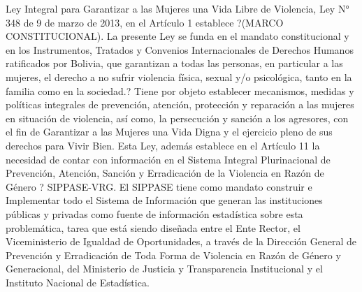 Ley Integral para Garantizar a las Mujeres una Vida Libre de Violencia, Ley N° 348 de 9 de marzo de 2013, en el Artículo 1 establece ?(MARCO CONSTITUCIONAL). La presente Ley se funda en el mandato constitucional y en los Instrumentos, Tratados y Convenios Internacionales de Derechos Humanos ratificados por Bolivia, que garantizan a todas las personas, en particular a las mujeres, el derecho a no sufrir violencia física, sexual y/o psicológica, tanto en la familia como en la sociedad.?
Tiene por objeto establecer mecanismos, medidas y políticas integrales de prevención, atención, protección y reparación a las mujeres en situación de violencia, así como, la persecución y sanción a los agresores, con el fin de Garantizar a las Mujeres una Vida Digna y el ejercicio pleno de sus derechos para Vivir Bien.
Esta Ley, además establece en el Artículo 11 la necesidad de contar con información en el Sistema Integral Plurinacional de Prevención, Atención, Sanción y Erradicación de la Violencia en Razón de Género ? SIPPASE-VRG.
El SIPPASE tiene como mandato construir e Implementar todo el Sistema de Información que generan las instituciones públicas y privadas como fuente de información estadística sobre esta problemática, tarea que está siendo diseñada entre el Ente Rector, el Viceministerio de Igualdad de Oportunidades, a través de la Dirección General de Prevención y Erradicación de Toda Forma de Violencia en Razón de Género y Generacional, del Ministerio de Justicia y Transparencia Institucional y el
Instituto Nacional de Estadística.

